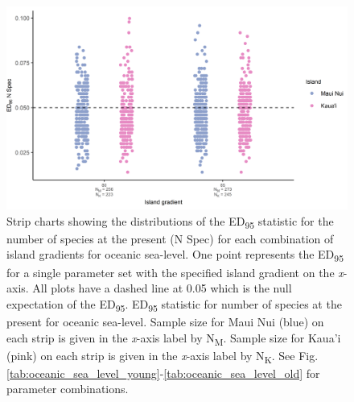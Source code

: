 \begin{figure}
    \centering
    \includegraphics{Island_gradient_sea_level_num_spec.png}
    \caption{Strip charts showing the distributions of the ED\textsubscript{95} statistic for the number of species at the present (N Spec) for each combination of island gradients for oceanic sea-level. One point represents the ED\textsubscript{95} for a single parameter set with the specified island gradient on the \textit{x}-axis. All plots have a dashed line at 0.05 which is the null expectation of the ED\textsubscript{95}. ED\textsubscript{95} statistic for number of species at the present for oceanic sea-level. Sample size for Maui Nui (blue) on each strip is given in the \textit{x}-axis label by N\textsubscript{M}. Sample size for Kaua'i (pink) on each strip is given in the \textit{x}-axis label by N\textsubscript{K}. See Fig. \ref{tab:oceanic_sea_level_young}-\ref{tab:oceanic_sea_level_old} for parameter combinations.}
    \label{fig:Island_gradient_sea_level_num_spec}
\end{figure}

